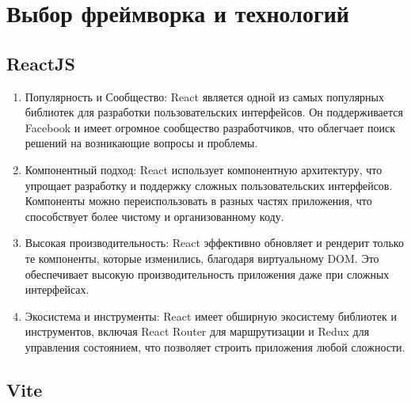 \chapter{Выбор фреймворка и технологий}\label{ch:---}


\section{ReactJS}\label{sec:---react}

\begin{enumerate}
    \item Популярность и Сообщество: React является одной из самых популярных библиотек для разработки пользовательских интерфейсов.
    Он поддерживается Facebook и имеет огромное сообщество разработчиков, что облегчает поиск решений на возникающие вопросы и проблемы.

    \item Компонентный подход: React использует компонентную архитектуру, что упрощает разработку и поддержку сложных пользовательских интерфейсов.
    Компоненты можно переиспользовать в разных частях приложения, что способствует более чистому и организованному коду.

    \item Высокая производительность: React эффективно обновляет и рендерит только те компоненты, которые изменились, благодаря виртуальному DOM\@.
    Это обеспечивает высокую производительность приложения даже при сложных интерфейсах.

    \item Экосистема и инструменты: React имеет обширную экосистему библиотек и инструментов, включая React Router для маршрутизации и Redux для управления состоянием, что позволяет строить приложения любой сложности.

\end{enumerate}


\section{Vite}\label{sec:---vite}

